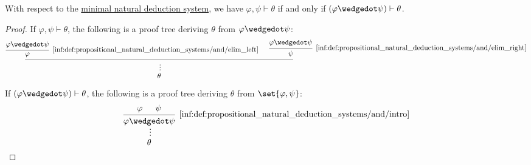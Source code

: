 \begin{proposition}\label{thm:syntactic_propositional_conjunction_of_premises}
  With respect to the \hyperref[def:propositional_natural_deduction_systems]{minimal natural deduction system}, we have \( \varphi, \psi \vdash \theta \) if and only if \( (\varphi \synwedge \psi) \vdash \theta \).
\end{proposition}
\begin{proof}
  \SufficiencySubProof If \( \varphi, \psi \vdash \theta \), the following is a proof tree deriving \( \theta \) from \( \varphi \synwedge \psi \):
  \begin{equation*}
    \begin{prooftree}
      \hypo{ \varphi \synwedge \psi }
      \infer1[\ref{inf:def:propositional_natural_deduction_systems/and/elim_left}]{ \varphi }

      \hypo{ \varphi \synwedge \psi }
      \infer1[\ref{inf:def:propositional_natural_deduction_systems/and/elim_right}]{ \psi }

      \infer2{}

      \ellipsis {} { \theta }
    \end{prooftree}
  \end{equation*}

  \NecessitySubProof If \( (\varphi \synwedge \psi) \vdash \theta \), the following is a proof tree deriving \( \theta \) from \( \set{ \varphi, \psi } \):
  \begin{equation*}
    \begin{prooftree}
      \hypo{ \varphi }
      \hypo{ \psi }
      \infer2[\ref{inf:def:propositional_natural_deduction_systems/and/intro}]{ \varphi \synwedge \psi }
      \ellipsis{}{ \theta }
    \end{prooftree}
  \end{equation*}
\end{proof}

